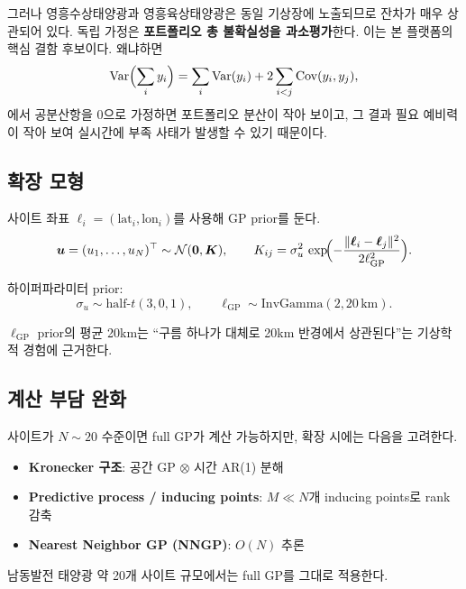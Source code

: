 \documentclass[11pt,a4paper]{article}
\begin{document}
그러나 영흥수상태양광과 영흥육상태양광은 동일 기상장에 노출되므로 잔차가 매우 상관되어 있다. 독립 가정은 \textbf{포트폴리오 총 불확실성을 과소평가}한다. 이는 본 플랫폼의 핵심 결함 후보이다. 왜냐하면
\begin{equation}
    \mathrm{Var}\Bigl(\sum_i y_i\Bigr) = \sum_i \mathrm{Var}(y_i) + 2\sum_{i<j}\mathrm{Cov}(y_i,y_j),
\end{equation}
에서 공분산항을 0으로 가정하면 포트폴리오 분산이 작아 보이고, 그 결과 필요 예비력이 작아 보여 실시간에 부족 사태가 발생할 수 있기 때문이다.

\subsection{확장 모형}

사이트 좌표 $\bm\ell_i = (\mathrm{lat}_i,\mathrm{lon}_i)$를 사용해 GP prior를 둔다.
\begin{equation}
    \bm u = (u_1,\dots,u_N)^{\top} \sim \mathcal{N}(\bm 0, \bm K),\qquad
    K_{ij} = \sigma^2_u\,\exp\!\Bigl(-\frac{\lVert\bm\ell_i-\bm\ell_j\rVert^2}{2\ell_{\mathrm{GP}}^2}\Bigr).
    \label{eq:gp_prior}
\end{equation}

하이퍼파라미터 prior:
\begin{equation}
    \sigma_u\sim\mathrm{half\mbox{-}}t(3,0,1),\qquad \ell_{\mathrm{GP}}\sim\mathrm{InvGamma}(2,20\,\mathrm{km}).
\end{equation}

$\ell_{\mathrm{GP}}$ prior의 평균 20km는 ``구름 하나가 대체로 20km 반경에서 상관된다''는 기상학적 경험에 근거한다.

\subsection{계산 부담 완화}

사이트가 $N\sim 20$ 수준이면 full GP가 계산 가능하지만, 확장 시에는 다음을 고려한다.
\begin{itemize}[leftmargin=2em]
    \item \textbf{Kronecker 구조}: 공간 GP $\otimes$ 시간 AR(1) 분해
    \item \textbf{Predictive process / inducing points}: $M\ll N$개 inducing points로 rank 감축
    \item \textbf{Nearest Neighbor GP (NNGP)}: $O(N)$ 추론
\end{itemize}

남동발전 태양광 약 20개 사이트 규모에서는 full GP를 그대로 적용한다.
\end{document}
